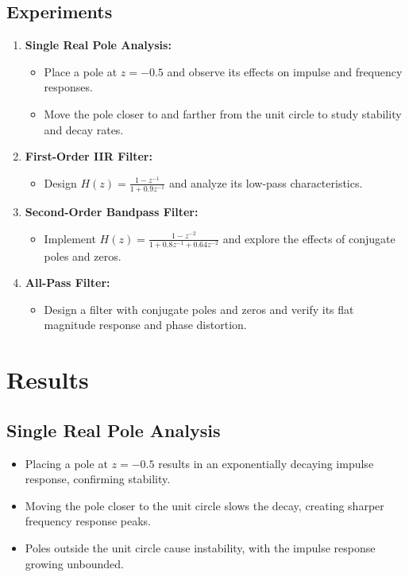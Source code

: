\documentclass[12pt]{article}
\begin{document}
	\subsection*{Experiments}
	\begin{enumerate}
		\item \textbf{Single Real Pole Analysis:}
		\begin{itemize}
			\item Place a pole at $z = -0.5$ and observe its effects on impulse and frequency responses.
			\item Move the pole closer to and farther from the unit circle to study stability and decay rates.
		\end{itemize}
		\item \textbf{First-Order IIR Filter:}
		\begin{itemize}
			\item Design $H(z) = \frac{1 - z^{-1}}{1 + 0.9z^{-1}}$ and analyze its low-pass characteristics.
		\end{itemize}
		\item \textbf{Second-Order Bandpass Filter:}
		\begin{itemize}
			\item Implement $H(z) = \frac{1 - z^{-2}}{1 + 0.8z^{-1} + 0.64z^{-2}}$ and explore the effects of conjugate poles and zeros.
		\end{itemize}
		\item \textbf{All-Pass Filter:}
		\begin{itemize}
			\item Design a filter with conjugate poles and zeros and verify its flat magnitude response and phase distortion.
		\end{itemize}
	\end{enumerate}
	
	\section*{Results}
	\subsection*{Single Real Pole Analysis}
	\begin{itemize}
		\item Placing a pole at $z = -0.5$ results in an exponentially decaying impulse response, confirming stability.
		\item Moving the pole closer to the unit circle slows the decay, creating sharper frequency response peaks.
		\item Poles outside the unit circle cause instability, with the impulse response growing unbounded.
	\end{itemize}
	
\end{document}
